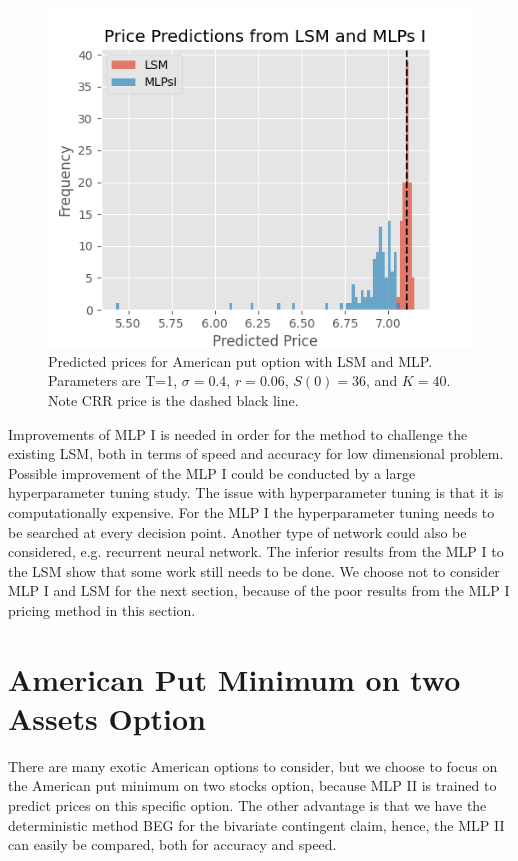 \begin{figure}[H]
\centering
\includegraphics{Figures/histLSMMLPsI.png}
\decoRule
\caption[Histogram Price Predictions]{Predicted prices for American put option with LSM and MLP. Parameters are T=1, $\sigma=0.4$, $r=0.06$, $S(0)=36$, and $K=40$. Note CRR price is the dashed black line.}
\label{fig:histLSMMLPI}
\end{figure}

Improvements of MLP I is needed in order for the method to challenge the existing LSM, both in terms of speed and accuracy for low dimensional problem. Possible improvement of the MLP I could be conducted by a large hyperparameter tuning study. The issue with hyperparameter tuning is that it is computationally expensive. For the MLP I the hyperparameter tuning needs to be searched at every decision point. Another type of network could also be considered, e.g. recurrent neural network. The inferior results from the MLP I to the LSM show that some work still needs to be done. We choose not to consider MLP I and LSM for the next section, because of the poor results from the MLP I pricing method in this section.\\
\section{American Put Minimum on two Assets Option}\label{bivariateAmerPut}
There are many exotic American options to consider, but we choose to focus on the American put minimum on two stocks option, because MLP II is trained to predict prices on this specific option. The other advantage is that we have the deterministic method BEG for the bivariate contingent claim, hence, the MLP II can easily be compared, both for accuracy and speed.\\


